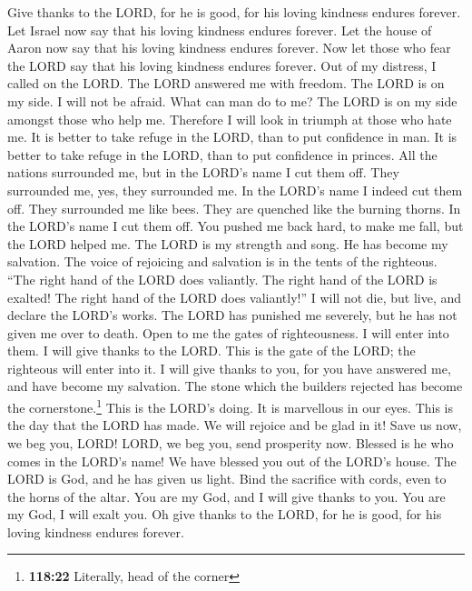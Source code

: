  Give thanks to the LORD, for he is good, for his loving
kindness endures forever.  Let Israel now say that his
loving kindness endures forever.  Let the house of Aaron
now say that his loving kindness endures forever.  Now let
those who fear the LORD say that his loving kindness endures forever.
 Out of my distress, I called on the LORD. The LORD
answered me with freedom.  The LORD is on my side. I will
not be afraid. What can man do to me?  The LORD is on my
side amongst those who help me. Therefore I will look in triumph at
those who hate me.  It is better to take refuge in the
LORD, than to put confidence in man.  It is better to take
refuge in the LORD, than to put confidence in princes. 
All the nations surrounded me, but in the LORD's name I cut them off.
 They surrounded me, yes, they surrounded me. In the
LORD's name I indeed cut them off.  They surrounded me
like bees. They are quenched like the burning thorns. In the LORD's name
I cut them off.  You pushed me back hard, to make me
fall, but the LORD helped me.  The LORD is my strength
and song. He has become my salvation.  The voice of
rejoicing and salvation is in the tents of the righteous. ``The right
hand of the LORD does valiantly.  The right hand of the
LORD is exalted! The right hand of the LORD does valiantly!''
 I will not die, but live, and declare the LORD's works.
 The LORD has punished me severely, but he has not given
me over to death.  Open to me the gates of righteousness.
I will enter into them. I will give thanks to the LORD. 
This is the gate of the LORD; the righteous will enter into it.
 I will give thanks to you, for you have answered me, and
have become my salvation.  The stone which the builders
rejected has become the cornerstone.\footnote{\textbf{118:22} Literally,
  head of the corner}  This is the LORD's doing. It is
marvellous in our eyes.  This is the day that the LORD
has made. We will rejoice and be glad in it!  Save us
now, we beg you, LORD! LORD, we beg you, send prosperity now.
 Blessed is he who comes in the LORD's name! We have
blessed you out of the LORD's house.  The LORD is God,
and he has given us light. Bind the sacrifice with cords, even to the
horns of the altar.  You are my God, and I will give
thanks to you. You are my God, I will exalt you.  Oh give
thanks to the LORD, for he is good, for his loving kindness endures
forever.

